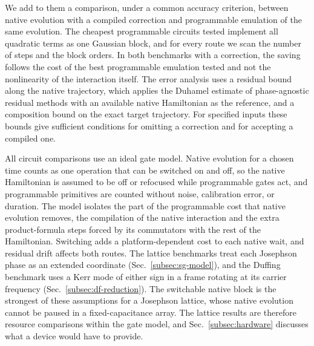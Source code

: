 \documentclass[pra,twocolumn,superscriptaddress,nofootinbib,floatfix]{revtex4-2}
\theoremstyle{remark}
\begin{document}
We add to them a comparison, under a common accuracy criterion, between native evolution with a compiled correction and programmable emulation of the same evolution. The cheapest programmable circuits tested implement all quadratic terms as one Gaussian block, and for every route we scan the number of steps and the block orders. In both benchmarks with a correction, the saving follows the cost of the best programmable emulation tested and not the nonlinearity of the interaction itself. The error analysis uses a residual bound along the native trajectory, which applies the Duhamel estimate of phase-agnostic residual methods \cite{Zoufal2023} with an available native Hamiltonian as the reference, and a composition bound on the exact target trajectory. For specified inputs these bounds give sufficient conditions for omitting a correction and for accepting a compiled one.

All circuit comparisons use an ideal gate model. Native evolution for a chosen time counts as one operation that can be switched on and off, so the native Hamiltonian is assumed to be off or refocused while programmable gates act, and programmable primitives are counted without noise, calibration error, or duration. The model isolates the part of the programmable cost that native evolution removes, the compilation of the native interaction and the extra product-formula steps forced by its commutators with the rest of the Hamiltonian. Switching adds a platform-dependent cost to each native wait, and residual drift affects both routes. The lattice benchmarks treat each Josephson phase as an extended coordinate (Sec.~\ref{subsec:sg-model}), and the Duffing benchmark uses a Kerr mode of either sign in a frame rotating at its carrier frequency (Sec.~\ref{subsec:df-reduction}). The switchable native block is the strongest of these assumptions for a Josephson lattice, whose native evolution cannot be paused in a fixed-capacitance array. The lattice results are therefore resource comparisons within the gate model, and Sec.~\ref{subsec:hardware} discusses what a device would have to provide.
\end{document}
